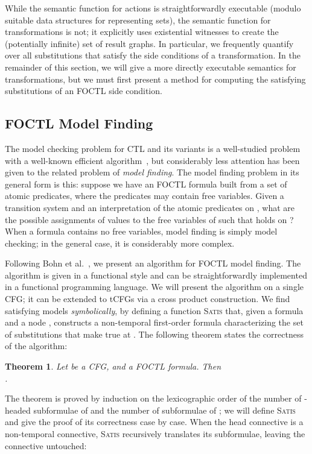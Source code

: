 \documentclass{eptcs}
\newtheorem{theorem}{Theorem}
\begin{document}
While the semantic function for actions is straightforwardly executable (modulo suitable data structures for representing sets), the semantic function for transformations is not; it explicitly uses existential witnesses to create the (potentially infinite) set of result graphs. In particular, we frequently quantify over all substitutions that satisfy the side conditions of a transformation. In the remainder of this section, we will give a more directly executable semantics for transformations, but we must first present a method for computing the satisfying substitutions of an \ac{FOCTL} side condition.

\subsection{FOCTL Model Finding}
\label{foctl}
The model checking problem for \ac{CTL} and its variants is a well-studied problem with a
well-known efficient algorithm~\cite{clarkemc}, but considerably less
attention has been given to the related problem of \emph{model finding}. The model
finding problem in its general form is this: suppose we have an \ac{FOCTL} formula  built from a set
of atomic predicates, where the predicates may contain free variables. Given a transition
system  and an interpretation of the atomic predicates on , what
are the possible assignments of values to the free variables of  such
that  holds on ? When a formula contains no free variables, model
finding is simply model checking; in the general case, it is considerably more complex. 

Following Bohn et al.~\cite{foctl}, we present an algorithm for \ac{FOCTL} model finding. The algorithm is given in a functional style and can be straightforwardly implemented in a functional programming language. 
We will present the algorithm on a single CFG; it can be extended to \acp{tCFG} via a cross
product construction. We find satisfying models \emph{symbolically}, by defining a function \textsc{Satis} that, given a formula  and a node , constructs a non-temporal first-order 
formula characterizing the set of substitutions that make  true at .
The following theorem states the correctness of the algorithm:

\begin{theorem}\label{mfcorrect}
Let  be a CFG,  and  a \ac{FOCTL} formula. Then
\\.
\end{theorem}

The theorem is proved by induction on the lexicographic order of the number of
-headed subformulae of  and the number of subformulae of
; we will define \textsc{Satis} and give the proof of its correctness case by case.
When the head connective is a non-temporal connective, 
\textsc{Satis} recursively translates its subformulae, leaving the connective untouched:
\end{document}
